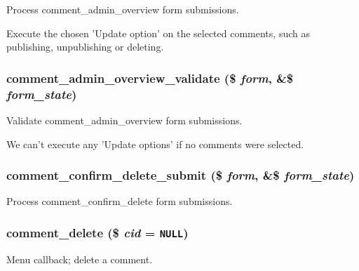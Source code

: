 Process comment\_\-admin\_\-overview form submissions.

Execute the chosen 'Update option' on the selected comments, such as publishing, unpublishing or deleting. \hypertarget{comment_8admin_8inc_60a994bc18cf6f4a9a71a478700f973e}{
\subsubsection[{comment\_\-admin\_\-overview\_\-validate}]{\setlength{\rightskip}{0pt plus 5cm}comment\_\-admin\_\-overview\_\-validate (\$ {\em form}, \/  \&\$ {\em form\_\-state})}}
\label{comment_8admin_8inc_60a994bc18cf6f4a9a71a478700f973e}


Validate comment\_\-admin\_\-overview form submissions.

We can't execute any 'Update options' if no comments were selected. \hypertarget{comment_8admin_8inc_4a91e7877e246726a22e875c215845bd}{
\subsubsection[{comment\_\-confirm\_\-delete\_\-submit}]{\setlength{\rightskip}{0pt plus 5cm}comment\_\-confirm\_\-delete\_\-submit (\$ {\em form}, \/  \&\$ {\em form\_\-state})}}
\label{comment_8admin_8inc_4a91e7877e246726a22e875c215845bd}


Process comment\_\-confirm\_\-delete form submissions. \hypertarget{comment_8admin_8inc_4dfff3bfc1b88804411f4faff2b6ddde}{
\subsubsection[{comment\_\-delete}]{\setlength{\rightskip}{0pt plus 5cm}comment\_\-delete (\$ {\em cid} = {\tt NULL})}}
\label{comment_8admin_8inc_4dfff3bfc1b88804411f4faff2b6ddde}


Menu callback; delete a comment.

